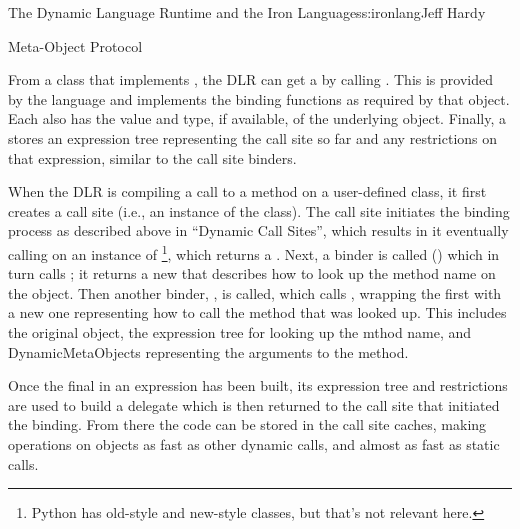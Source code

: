 \begin{aosachapter}{The Dynamic Language Runtime and the Iron Languages}{s:ironlang}{Jeff Hardy}
\begin{aosasect1}{Meta-Object Protocol}

From a class that implements , the DLR can get
a  by calling . This
 is provided by the language and implements the binding
functions as required by that object. Each  also has
the value and type, if available, of the underlying object. Finally, a
 stores an expression tree representing the call site
so far and any restrictions on that expression, similar to the call site
binders. 

When the DLR is compiling a call to a method on a user-defined class, it first
creates a call site (i.e., an instance of the  class). The call
site initiates the binding process as described above in ``Dynamic Call
Sites'', which results in it eventually calling  on an
instance of \footnote{Python has old-style and new-style
classes, but that's not relevant here.}, which returns a .
Next, a binder is called () which in turn
calls ; it returns a new
 that describes how to look up the method name on the
object. Then another binder, , is called, which
calls , wrapping the first
 with a new one representing how to call the method
that was looked up. This includes the original object, the expression tree for
looking up the mthod name, and DynamicMetaObjects representing the arguments to
the method.

Once the final  in an expression has been built, its
expression tree and restrictions are used to build a delegate which is then
returned to the call site that initiated the binding. From there the code can
be stored in the call site caches, making operations on objects as fast as
other dynamic calls, and almost as fast as static calls.


\end{aosasect1}
\end{aosachapter}

